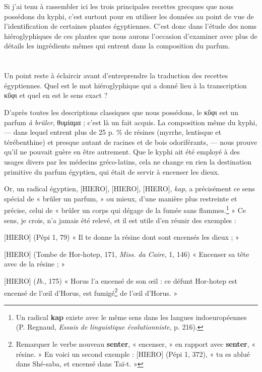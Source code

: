 \documentclass[a4paper, 11pt, oneside]{article}
\begin{document}
Si j'ai tenu à rassembler ici les trois principales recettes grecques que nous possédons du kyphi, c'est surtout pour en utiliser les données au point de vue de l'identification de certaines plantes égyptiennes. C'est donc dans l'étude des noms hiéroglyphiques de ces plantes que nous aurons l'occasion d'examiner avec plus de détails les ingrédients mêmes qui entrent dans la composition du parfum.
\clearpage
\section{}
\paragraph{}
Un point reste à éclaircir avant d'entreprendre la traduction des recettes égyptiennes. Quel est le mot hiéroglyphique qui a donné lieu à la transcription κῦφι et quel en est le sens exact ?

D'après toutes les descriptions classiques que nous possédons, le κῦφι est un parfum \emph{à brûler}, θυμίαμα ; c'est là un fait acquis. La composition même du kyphi, --- dans lequel entrent plus de 25 p. \% de résines (myrrhe, lentisque et térébenthine) et presque autant de racines et de bois odoriférants, --- nous prouve qu'il ne pouvait guère en être autrement. Que le kyphi ait été employé à des usages divers par les médecins gréco-latins, cela ne change en rien la destination primitive du parfum égyptien, qui était de servir à encenser les dieux.

Or, un radical égyptien, [HIERO], [HIERO], [HIERO], \emph{kap}, a précisément ce sens spécial de « brûler un parfum, » ou mieux, d'une manière plus restreinte et précise, celui de « brûler un corps qui dégage de la fumée sans flammes.\footnote{Un radical \textbf{kap} existe avec le même sens dans les langues indoeuropéennes (P. Regnaud, \emph{Essais de linguistique évolutionniste}, p. 216).} » Ce sens, je crois, n'a jamais été relevé, et il est utile d'en réunir des exemples :

[HIERO] (Pépi 1, 79) « Il te donne la résine dont sont encensés les dieux ; »

[HIERO] (Tombe de Hor-hotep, 171, \emph{Miss. da Caire}, 1, 146) « Encenser sa tête avec de la résine ; »

[HIERO] (\emph{Ib.}, 175) « Horus l'a encensé de son œil : ce défunt Hor-hotep est encensé de l'œil d'Horus, est fumigé\footnote{Remarquer le verbe nouveau \textbf{senter}, « encenser, » en rapport avec \textbf{senter}, « résine. » En voici un second exemple : [HIERO] (Pépi 1, 372), « tu es ablué dans Shé-saba, et encensé dans Taï-t. »} de l'œil d'Horus. »
\end{document}
